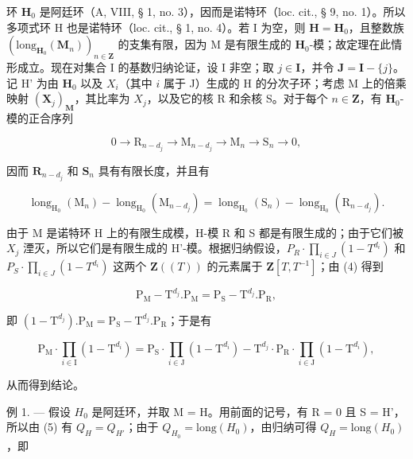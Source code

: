 环 \(\mathbf{H}_0\) 是阿廷环（A, VIII, § 1, no. 3），因而是诺特环（loc. cit., § 9, no. 1）。所以多项式环 H 也是诺特环（loc. cit., § 1, no. 4）。若 I 为空，则 \(\mathbf{H} = \mathbf{H}_0\)，且整数族 \((\mathrm{long}_{\mathbf{H}_0}(\mathbf{M}_n))_{n \in \mathbf{Z}}\) 的支集有限，因为 M 是有限生成的 \(\mathbf{H}_0\)-模；故定理在此情形成立。现在对集合 I 的基数归纳论证，设 I 非空；取 \(j \in \mathbf{I}\)，并令 \(\mathbf{J} = \mathbf{I} - \{j\}\)。记 H' 为由 \(\mathbf{H}_0\) 以及 \(X_i\)（其中 \(i\) 属于 J）生成的 H 的分次子环；考虑 M 上的倍乘映射 \((\mathbf{X}_j)_\mathbf{M}\)，其比率为 \(X_j\)，以及它的核 R 和余核 S。对于每个 \(n \in \mathbf{Z}\)，有 \(\mathbf{H}_0\)-模的正合序列

\[
0 \rightarrow \mathrm{R} _ {n - d _ {j}} \rightarrow \mathrm{M} _ {n - d _ {j}} \rightarrow \mathrm{M} _ {n} \rightarrow \mathrm{S} _ {n} \rightarrow 0,
\]

因而 \(\mathbf{R}_{n - d_j}\) 和 \(\mathbf{S}_n\) 具有有限长度，并且有

\[
\operatorname{long} _ {\mathrm{H} _ {0}} \left(\mathrm{M} _ {n}\right) - \operatorname{long} _ {\mathrm{H} _ {0}} \left(\mathrm{M} _ {n - d _ {j}}\right) = \operatorname{long} _ {\mathrm{H} _ {0}} \left(\mathrm{S} _ {n}\right) - \operatorname{long} _ {\mathrm{H} _ {0}} \left(\mathrm{R} _ {n - d _ {j}}\right).\tag{4}
\]

由于 M 是诺特环 H 上的有限生成模，H-模 R 和 S 都是有限生成的；由于它们被 \(X_{j}\) 湮灭，所以它们是有限生成的 H'-模。根据归纳假设，\(P_{R}\cdot\prod_{i\in J}(1-T^{d_{i}})\) 和 \(P_{S}\cdot\prod_{i\in J}(1-T^{d_{i}})\) 这两个 \(\mathbf{Z}((T))\) 的元素属于 \(\mathbf{Z}[T,T^{-1}]\)；由 (4) 得到

\[
\mathrm{P} _ {\mathrm{M}} - \mathrm{T} ^ {d _ {j}}. \mathrm{P} _ {\mathrm{M}} = \mathrm{P} _ {\mathrm{S}} - \mathrm{T} ^ {d _ {j}}. \mathrm{P} _ {\mathrm{R}},
\]

即 \((1 - \mathrm{T}^{d_j}).\mathrm{P}_{\mathrm{M}} = \mathrm{P}_{\mathrm{S}} - \mathrm{T}^{d_j}.\mathrm{P}_{\mathrm{R}}\)；于是有

\[
\mathrm{P} _ {\mathrm{M}} \cdot \prod_ {i \in \mathrm{I}} (1 - \mathrm{T} ^ {d _ {i}}) = \mathrm{P} _ {\mathrm{S}} \cdot \prod_ {i \in \mathrm{J}} (1 - \mathrm{T} ^ {d _ {i}}) - \mathrm{T} ^ {d _ {j}} \cdot \mathrm{P} _ {\mathrm{R}} \cdot \prod_ {i \in \mathrm{J}} (1 - \mathrm{T} ^ {d _ {i}}),\tag{5}
\]

从而得到结论。

例 1. --- 假设 \(H_{0}\) 是阿廷环，并取 M = H。用前面的记号，有 R = 0 且 S = H'，所以由 (5) 有 \(Q_{H} = Q_{H'}\)；由于 \(Q_{H_{0}} = \text{long}(H_{0})\)，由归纳可得 \(Q_{H} = \text{long}(H_{0})\)，即

